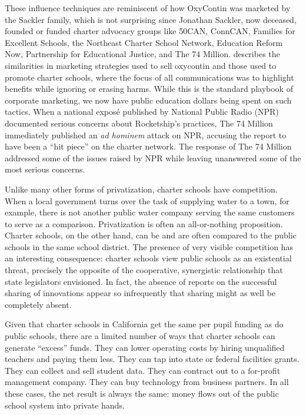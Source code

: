 These influence techniques are reminiscent of how OxyContin was marketed by the Sackler family, which is not surprising since Jonathan Sackler, now deceased, founded or funded charter advocacy groups like 50CAN, ConnCAN, Families for Excellent Schools, the Northeast Charter School Network, Education Reform Now, Partnership for Educational Justice, and The 74 Million. \textcite{Dubb2017} describes the similarities in marketing strategies used to sell oxycontin and those used to promote charter schools, where the focus of all communications was to highlight benefits while ignoring or erasing harms. While this is the standard playbook of corporate marketing, we now have public education dollars being spent on such tactics. When a national exposé published by National Public Radio (NPR) documented serious concerns about Rocketship's practices, The 74 Million immediately published an \textit{ad hominem} attack on NPR, accusing the report to have been a ``hit piece'' on the charter network. The response of The 74 Million addressed some of the issues raised by NPR while leaving unanswered some of the most serious concerns.

Unlike many other forms of privatization, charter schools have competition. When a local government turns over the task of supplying water to a town, for example, there is not another public water company serving the same customers to serve as a comparison. Privatization is often an all-or-nothing proposition. Charter schools, on the other hand, can be and are often compared to the public schools in the same school district. The presence of very visible competition has an interesting consequence: charter schools view public schools as an existential threat, precisely the opposite of the cooperative, synergistic relationship that state legislators envisioned. In fact, the absence of reports on the successful sharing of innovations appear so infrequently that sharing might as well be completely absent. 

Given that charter schools in California get the same per pupil funding as do public schools, there are a limited number of ways that charter schools can generate ``excess'' funds. They can lower operating costs by hiring unqualified teachers and paying them less. They can tap into state or federal facilities grants. They can collect and sell student data. They can contract out to a for-profit management company. They can buy technology from business partners. In all these cases, the net result is always the same: money flows out of the public school system into private hands.


